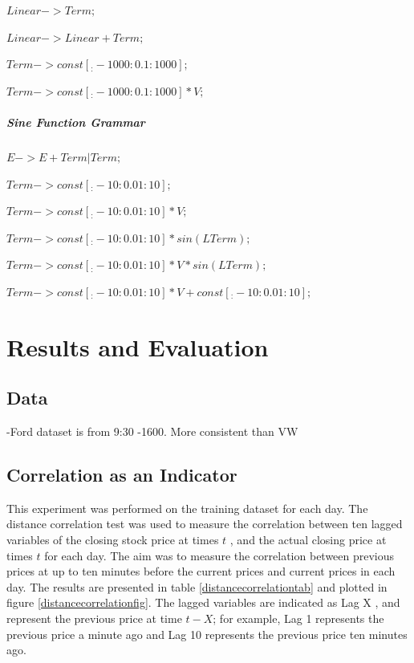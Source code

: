 \documentclass[13pt]{report}
\begin{document}
$Linear -> Term;$\par
$Linear -> Linear + Term;$ \par
$Term -> const[_:-1000:0.1:1000];$ \par
$Term -> const[_:-1000:0.1:1000] * V;$ \par


\paragraph{Sine Function Grammar} \hfill \break

$E -> E + Term | Term;$\par
$Term -> const[_{:}-10:0.01:10];$\par
$Term -> const[_{:}-10:0.01:10]*V;$\par
$Term -> const[_{:}-10:0.01:10]*sin(LTerm);$\par
$Term -> const[_{:}-10:0.01:10]*V*sin(LTerm);$ \par
$Term -> const[_{:}-10:0.01:10]*V+const[_{:}-10:0.01:10];$




\chapter{Results and Evaluation}


\section{Data}
-Ford dataset is from 9:30 -1600. More consistent than VW
\section{Correlation as an Indicator}
This experiment was performed on the training dataset for each day. The distance correlation test was used to measure the correlation between ten lagged variables of the closing stock price at times $t$ , and the actual closing price at times $t$ for each day. The aim was to measure the correlation between previous prices at up to ten minutes before the current prices and current prices in each day. The results are presented in table \ref{distancecorrelationtab} and plotted in  figure \ref{distancecorrelationfig}. The lagged variables are indicated as Lag X , and represent the previous price at time $t-X$; for example, Lag 1 represents the previous price a minute ago and Lag 10 represents the previous price ten minutes ago.
\end{document}
